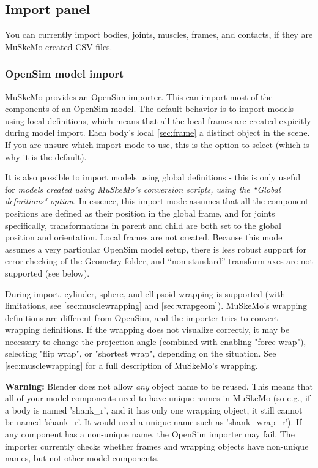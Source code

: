 \documentclass{article}
\begin{document}
\subsection{Import panel}

You can currently import bodies, joints, muscles, frames, and contacts, if they are MuSkeMo-created CSV files.

\subsubsection{OpenSim model import}
\label{sec:opensimimporter}
MuSkeMo provides an OpenSim importer. This can import most of the components of an OpenSim model. The default behavior is to import models using local definitions, which means that all the local frames are created expicitly during model import. Each body's local \ref{sec:frame} a distinct object in the scene. If you are unsure which import mode to use, this is the option to select (which is why it is the default).

It is also possible to import models using global definitions - this is only useful for \textit{models created using MuSkeMo's conversion scripts, using the ``Global definitions" option}. In essence, this import mode assumes that all the component positions are defined as their position in the global frame, and for joints specifically, transformations in parent and child are both set to the global position and orientation. Local frames are not created. Because this mode assumes a very particular OpenSim model setup, there is less robust support for error-checking of the Geometry folder, and ``non-standard'' transform axes are not supported (see below).

During import, cylinder, sphere, and ellipsoid wrapping is supported (with limitations, see \ref{sec:musclewrapping} and \ref{sec:wrapgeom}). MuSkeMo's wrapping definitions are different from OpenSim, and the importer tries to convert wrapping definitions. If the wrapping does not visualize correctly, it may be necessary to change the projection angle (combined with enabling "force wrap"), selecting "flip wrap", or "shortest wrap", depending on the situation. See \ref{sec:musclewrapping} for a full description of MuSkeMo's wrapping.

\textbf{Warning:} Blender does not allow \textit{any} object name to be reused. This means that all of your model components need to have unique names in MuSkeMo (so e.g., if a body is named 'shank\_r', and it has only one wrapping object, it still cannot be named 'shank\_r'. It would need a unique name such as 'shank\_wrap\_r'). If any component has a non-unique name, the OpenSim importer may fail. The importer currently checks whether frames and wrapping objects have non-unique names, but not other model components.
\end{document}
